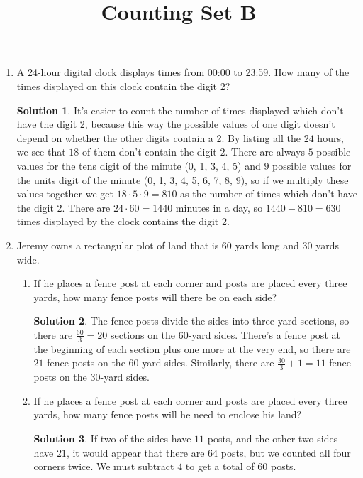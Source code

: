 \documentclass{article}
\title{Counting Set B}
\author{}
\date{}
\theoremstyle{definition}
\newtheorem*{solution}{Solution}
\begin{document}
\maketitle
\begin{enumerate}
    \item A 24-hour digital clock displays times from 00:00 to 23:59. How 
        many of the times displayed on this clock contain the digit 2?
        \begin{solution}
            It's easier to count the number of times displayed which don't have 
            the digit 2, because this way the possible values of one digit 
            doesn't depend on whether the other digits contain a 2. By listing 
            all the $24$ hours, we see that $18$ of them don't contain the digit 
            $2$. There are always $5$ possible values for the tens digit of the 
            minute (0, 1, 3, 4, 5) and $9$ possible values for the units digit 
            of the minute (0, 1, 3, 4, 5, 6, 7, 8, 9), so if we multiply these 
            values together we get $18 \cdot 5 \cdot 9 = 810$ as the number of 
            times which don't have the digit 2. There are $24 \cdot 60 = 1440$ 
            minutes in a day, so $1440 - 810 = 630$ times displayed by the clock 
            contains the digit 2.
        \end{solution}
    \item Jeremy owns a rectangular plot of land that is 60 yards long and 
        30 yards wide.
        \begin{enumerate}
            \item If he places a fence post at each corner and posts are placed 
                every three yards, how many fence posts will there be on each 
                side?
                \begin{solution}
                    The fence posts divide the sides into three yard sections, 
                    so there are $\frac{60}{3} = 20$ sections on the $60$-yard 
                    sides. There's a fence post at the beginning of each section 
                    plus one more at the very end, so there are $21$ fence posts 
                    on the $60$-yard sides. Similarly, there are $\frac{30}{3} + 
                    1 = 11$ fence posts on the $30$-yard sides.
                \end{solution}
            \item If he places a fence post at each corner and posts are placed 
                every three yards, how many fence posts will he need to enclose 
                his land?
                \begin{solution}
                    If two of the sides have $11$ posts, and the other two sides 
                    have $21$, it would appear that there are $64$ posts, but we 
                    counted all four corners twice. We must subtract $4$ to get 
                    a total of $60$ posts.


\end{solution}
\end{enumerate}
\end{enumerate}
\end{document}
